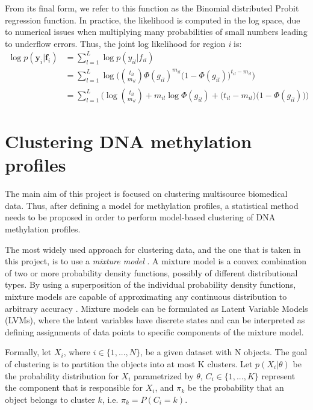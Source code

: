 From its final form, we refer to this function as the Binomial distributed Probit regression function. In practice, the likelihood is computed in the log space, due to numerical issues when multiplying many probabilities of small numbers leading to underflow errors. Thus, the joint log likelihood for region \emph{i} is:
\begin{equation} \label{likel-binom-prob-log-f}
  \begin{split}
	\log p(\mathbf{y}_{i}|\mathbf{f}_{i}) & = \sum_{l=1}^{L} \log p(y_{il}|f_{il}) \\
				& = \sum_{l=1}^{L} \log \bigg(\binom{t_{il}}{m_{il}} \Phi(g_{il})^{m_{il}} \big(1 - \Phi(g_{il})\big)^{t_{il} - m_{il}}\bigg) \\
				& = \sum_{l=1}^{L} \bigg(\log \binom{t_{il}}{m_{il}} + m_{il} \log \Phi(g_{il}) + \big(t_{il} - m_{il} \big) \big(1 - \Phi(g_{il})\big)\bigg)
  \end{split}
\end{equation}


\section{Clustering DNA methylation profiles}
The main aim of this project is focused on clustering multisource biomedical data. Thus, after defining a model for methylation profiles, a statistical method needs to be proposed in order to perform model-based clustering of DNA methylation profiles.

The most widely used approach for clustering data, and the one that is taken in this project, is to use a \emph{mixture model} \citep{McLachlan1988}. A mixture model is a convex combination of two or more probability density functions, possibly of different distributional types. By using a superposition of the individual probability density functions, mixture models are capable of approximating any continuous distribution to arbitrary accuracy \citep{Marin2005}. Mixture models can be formulated as Latent Variable Models (LVMs), where the latent variables have discrete states and can be interpreted as defining assignments of data points to specific components of the mixture model.

Formally, let $X_{i}$, where $i \in \lbrace 1, ... , N \rbrace$, be a given dataset with N objects. The goal of clustering is to partition the objects into at most K clusters. Let $p(X_{i}|\theta)$ be the probability distribution for $X_{i}$ parametrized by $\theta$, $C_{i} \in \lbrace 1,...,K \rbrace$ represent the  component that is responsible for $X_{i}$, and $\pi_{k}$ be the probability that an object belongs to cluster $k$, i.e. $\pi_{k} = P(C_{i} = k)$. 

